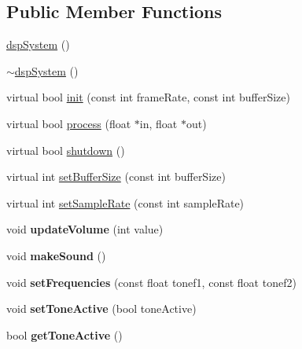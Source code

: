 \subsection*{Public Member Functions}
\begin{DoxyCompactItemize}
\item 
\hyperlink{classdspSystem_a3b40bd9107e62a5dc47cab7a8acd4831}{dsp\+System} ()
\item 
\hyperlink{classdspSystem_a8e60ef1e72e63a5362141a9e6c3efcfe}{$\sim$dsp\+System} ()
\item 
virtual bool \hyperlink{classdspSystem_a57676105878d826fe28c9faf9bd83c3e}{init} (const int frame\+Rate, const int buffer\+Size)
\item 
virtual bool \hyperlink{classdspSystem_addff0f24f52320d613d7303b2a15562f}{process} (float $\ast$in, float $\ast$out)
\item 
virtual bool \hyperlink{classdspSystem_aaeee5d8676285bbb2402739edabe5d09}{shutdown} ()
\item 
virtual int \hyperlink{classdspSystem_aefaba04b05be939878a29de212c43d72}{set\+Buffer\+Size} (const int buffer\+Size)
\item 
virtual int \hyperlink{classdspSystem_ac6fe7760ea257a9763556752f2017120}{set\+Sample\+Rate} (const int sample\+Rate)
\item 
\mbox{\label{classdspSystem_afca020bff8c29a9b7570d718bc5966af}} 
void {\bfseries update\+Volume} (int value)
\item 
\mbox{\label{classdspSystem_ae972f6ccec4b193fce4f4d66cc0c6ce1}} 
void {\bfseries make\+Sound} ()
\item 
\mbox{\label{classdspSystem_a4caaab318d3ff55da81fb66d254dbb85}} 
void {\bfseries set\+Frequencies} (const float tonef1, const float tonef2)
\item 
\mbox{\label{classdspSystem_a2ad4a27f5fbd26c69255d5c3919f2a5e}} 
void {\bfseries set\+Tone\+Active} (bool tone\+Active)
\item 
\mbox{\label{classdspSystem_ab0bc792027152192beab744811168740}} 
bool {\bfseries get\+Tone\+Active} ()
\item 
\mbox{\label{classdspSystem_a9074dfd42c40d4dd4c7716999c3906bf}} 

\end{DoxyCompactItemize}
